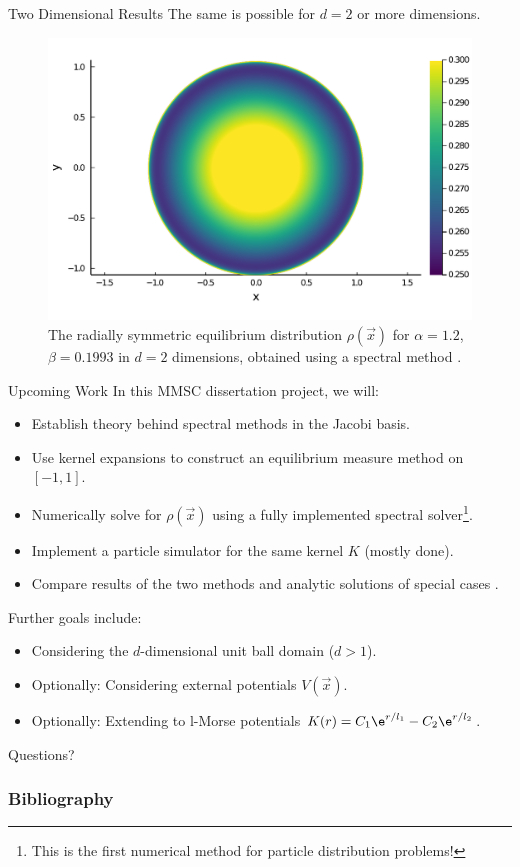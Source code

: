 \documentclass[aspectratio=169, hyperref={colorlinks=true}]{beamer}
\begin{document}
  \begin{frame}{Two Dimensional Results}
    \vspace{0.4cm}
    The same is possible for $d = 2$ or more dimensions.
    \begin{figure}[H]
      \centering
      \includegraphics[width=0.5\linewidth]{figures/spectral-solution-2d.pdf}
      \caption*{The radially symmetric equilibrium distribution $\rho(\vec{x})$ for $\alpha = 1.2$, $\beta = 0.1993$ in $d = 2$ dimensions, obtained using a spectral method \cite{2021-arbitrary-dimensions}.}
    \end{figure}
  \end{frame}

  \begin{frame}{Upcoming Work}
    In this MMSC dissertation project, we will:
    \begin{itemize}
      \tightlist
      \item Establish theory behind spectral methods in the Jacobi basis.
      \item Use kernel expansions to construct an equilibrium measure method on $[-1, 1]$.
      \item Numerically solve for $\rho(\vec{x})$ using a fully implemented spectral solver\footnote{This is the first numerical method for particle distribution problems!}.
      \item Implement a particle simulator for the same kernel $K$ (mostly done).
      \item Compare results of the two methods and analytic solutions of special cases \cite{2014-explicit-flock-solutions-for-quasi-morse-potentials}.
    \end{itemize}
    Further goals include:
    \begin{itemize}
      \tightlist
      \item Considering the $d$-dimensional unit ball domain ($d > 1$).
      \item Optionally: Considering external potentials $V(\vec{x})$.
      \item Optionally: Extending to l-Morse potentials $K(r) = C_1 \e^{r / l_1} - C_2 \e^{r / l_2}$.
    \end{itemize}
  \end{frame}

  \begin{frame}{}
    Questions?
  \end{frame}

  \begin{frame}[allowframebreaks]
    \frametitle{Bibliography}
    \printbibliography[heading=bibnumbered]
  \end{frame}
\end{document}
